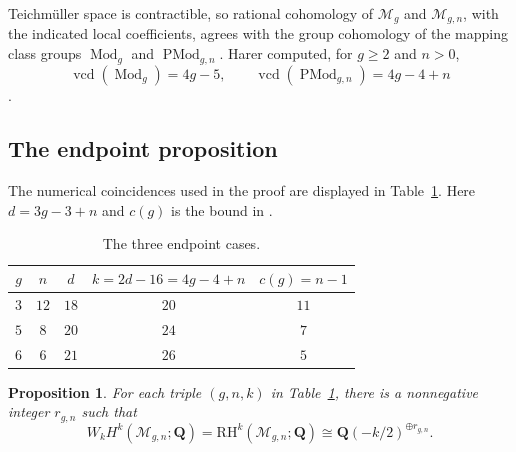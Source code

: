 \documentclass[12pt,reqno]{amsart}
\newcommand{\Q}{\mathbf{Q}}
\newcommand{\M}{\mathcal{M}}
\newcommand{\RH}{\mathrm{RH}}
\newcommand{\Mod}{\operatorname{Mod}}
\newcommand{\PMod}{\operatorname{PMod}}
\newcommand{\vcd}{\operatorname{vcd}}
\newtheorem{proposition}[theorem]{Proposition}
\theoremstyle{definition}
\theoremstyle{remark}
\begin{document}
Teichm\"uller space is contractible, so rational cohomology of $\M_g$ and
$\M_{g,n}$, with the indicated local coefficients, agrees with the group
cohomology of the mapping class groups $\Mod_g$ and $\PMod_{g,n}$.
Harer computed, for $g\geq2$ and $n>0$,
\begin{equation}\label{eq:harer-vcd}
  \vcd(\Mod_g)=4g-5,
  \qquad
  \vcd(\PMod_{g,n})=4g-4+n
\end{equation}
\cite[Theorem~4.1]{Harer}.

\subsection{The endpoint proposition}

The numerical coincidences used in the proof are displayed in
Table~\ref{tab:endpoints}.  Here $d=3g-3+n$ and $c(g)$ is the bound in
\cite[Table~1]{CLP}.

\begin{table}[ht]
\centering
\caption{The three endpoint cases.}\label{tab:endpoints}
\begin{tabular}{@{}ccccc@{}}
\toprule
$g$ & $n$ & $d$ & $k=2d-16=4g-4+n$ & $c(g)=n-1$\\
\midrule
$3$ & $12$ & $18$ & $20$ & $11$\\
$5$ & $8$  & $20$ & $24$ & $7$\\
$6$ & $6$  & $21$ & $26$ & $5$\\
\bottomrule
\end{tabular}
\end{table}

\begin{proposition}\label{prop:endpoint-open}
For each triple $(g,n,k)$ in Table~\ref{tab:endpoints}, there is a
nonnegative integer $r_{g,n}$ such that
\begin{equation}\label{eq:endpoint-open}
  W_kH^k(\M_{g,n};\Q)
  =\RH^k(\M_{g,n};\Q)
  \cong\Q(-k/2)^{\oplus r_{g,n}}.
\end{equation}
\end{proposition}
\end{document}
